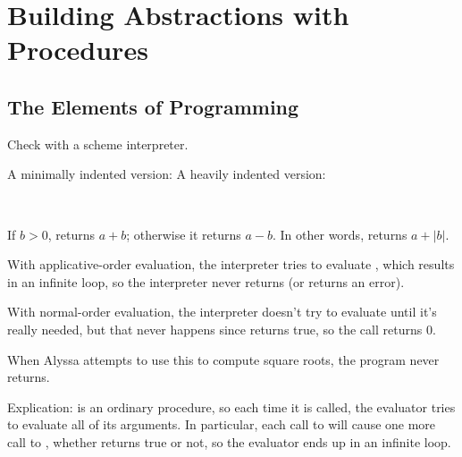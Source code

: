 \chapter{Building Abstractions with Procedures}

\section{The Elements of Programming}

\begin{exe}[1.1]
    Check with a scheme interpreter.
\end{exe}

\begin{exe}[1.2]
    A minimally indented version:
    A heavily indented version:
\end{exe}

\begin{exe}[1.3]
    \ \vspace{-20pt}
\end{exe}

\begin{exe}[1.4]
    If $b > 0$,  returns $a + b$; otherwise it returns 
    $a - b$. In other words,  returns $a + |b|$.
\end{exe}

\begin{exe}[1.5]
    With applicative-order evaluation, the interpreter tries to evaluate 
    , which results in an infinite loop, so the interpreter never 
    returns (or returns an error).

    With normal-order evaluation, the interpreter doesn't try to evaluate 
     until it's really needed, but that never happens since
     returns true, so the call returns 0.
\end{exe}

\begin{exe}[1.6]
    When Alyssa attempts to use this to compute square roots, the program never 
    returns.

    Explication:  is an ordinary procedure, so each time it is 
    called, the evaluator tries to evaluate all of its arguments. In particular, 
    each call to  will cause one more call to , 
    whether  returns true or not, so the evaluator 
    ends up in an infinite loop.
\end{exe}

